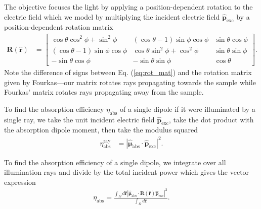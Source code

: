 \documentclass[10pt]{article}
\providecommand{\mb}[1]{\mathbf{#1}}
\providecommand{\mh}[1]{\mathbf{\hat{#1}}}
\providecommand{\bs}[1]{\boldsymbol{#1}}
\begin{document}
  The objective focuses the light by applying a position-dependent rotation to
  the electric field which we model by multiplying the incident electric field
  $\hat{\mb{p}}_{\text{exc}}$ by a position-dependent rotation matrix
  \begin{align}
  \mb{R}(\mh{r}) &= \begin{bmatrix} \cos\theta\cos^2\phi + \sin^2\phi & (\cos\theta -1)\sin\phi\cos\phi & \sin\theta\cos\phi\\ (\cos\theta - 1)\sin\phi\cos\phi & \cos\theta\sin^2\phi + \cos^2\phi & \sin\theta\sin\phi \\ -\sin\theta\cos\phi& -\sin\theta\sin\phi & \cos\theta \end{bmatrix} \label{eq:rot_mat}.
  \end{align}
  \hypertarget{signs}
  {{\color{urlblue}Note the difference of signs between Eq.
  (\ref{eq:rot_mat}) and the rotation matrix given by
    Fourkas---our matrix rotates rays propagating towards the sample while
    Fourkas' matrix rotates rays propagating away from the sample.}}

  To find the absorption efficiency $\eta_{\text{abs}}$ of a single dipole if
  it were illuminated by a single ray, we take the unit incident electric field
  $\hat{\mb{p}}_{\text{exc}}$, take the dot product with the absorption dipole
  moment, then take the modulus squared
    \begin{align}
      \eta_{\text{abs}}^{\text{ray}} &= |\hat{\bs{\mu}}_{\text{abs}}\cdot\mh{p}_{\text{exc}}|^2. \label{eq:singleray}
    \end{align}

    To find the absorption efficiency of a single dipole, we integrate over
    all illumination rays and divide by the total incident power which gives the
    vector expression
\begin{align}
  \eta_{\text{abs}} = \frac{\int_{\Omega}d\mh{r}|\hat{\bs{\mu}}_{\text{abs}}\cdot\mb{R}(\mh{r})\mh{p}_{\text{exc}}|^2}{\int_{\Omega}d\mh{r}}\label{eq:abs}. 
\end{align}
\end{document}
